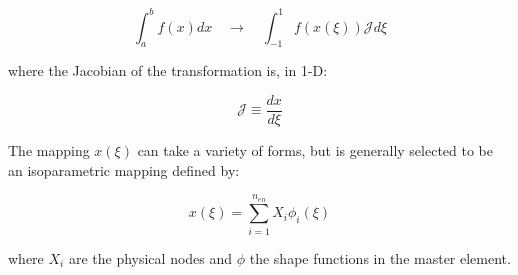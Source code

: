 \documentclass[10pt]{article}
\numberwithin{equation}{section} %
\begin{document}
\begin{equation}
\int_{a}^{b}f(x)dx\quad\rightarrow\quad\int_{-1}^{1}f(x(\xi))\mathscr{J}d\xi
\end{equation}

where the Jacobian of the transformation is, in 1-D:

\begin{equation}
\mathscr{J}\equiv\frac{dx}{d\xi}
\end{equation}

The mapping \(x(\xi)\) can take a variety of forms, but is generally selected to be an isoparametric mapping defined by:

\begin{equation}
x(\xi)=\sum_{i=1}^{n_{en}}X_i\phi_i(\xi)
\end{equation}

where \(X_i\) are the physical nodes and \(\phi\) the shape functions in the master element.
\end{document}
